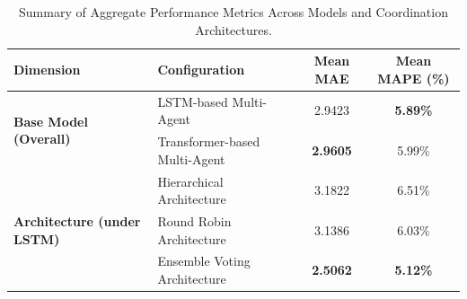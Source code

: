 \begin{table}[t]
\centering
\caption{Summary of Aggregate Performance Metrics Across Models and Coordination Architectures.}
\label{tab:aggregate_performance_summary}
\begin{tabular*}{\textwidth}{@{\extracolsep{\fill}}llcc@{}}
\toprule
\textbf{Dimension} & \textbf{Configuration} & \textbf{Mean MAE} & \textbf{Mean MAPE (\%)} \\ \midrule
\multirow{2}{*}{\textbf{Base Model (Overall)}} & LSTM-based Multi-Agent & 2.9423 & \textbf{5.89\%} \\
                                             & Transformer-based Multi-Agent & \textbf{2.9605} & 5.99\% \\ \midrule
\multirow{3}{*}{\textbf{Architecture (under LSTM)}} & Hierarchical Architecture & 3.1822 & 6.51\% \\
                                                      & Round Robin Architecture & 3.1386 & 6.03\% \\
                                                      & Ensemble Voting Architecture & \textbf{2.5062} & \textbf{5.12\%} \\ \bottomrule
\end{tabular*}
\end{table}